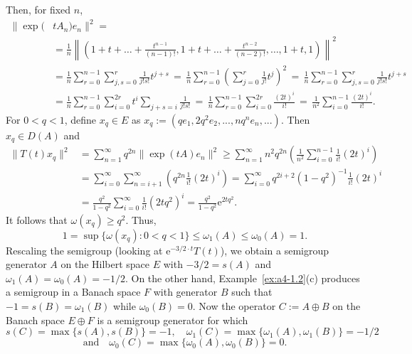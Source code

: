 \begin{example}
Then, for fixed $n$, 
\begin{align*}
\|\exp(&t A_n) e_n\|^2 = \\
&= \frac{1}{n} \left\| (1 + t + \dots + \frac{t^{n-1}}{(n-1)!}, 1 + t + \dots + \frac{t^{n-2}}{(n-2)!}, \dots, 1+t, 1) \right\|^2 \\
&=
\frac{1}{n} \sum_{r=0}^{n-1} \sum_{j,s=0}^{r} \frac{1}{j!s!} t^{j+s} \, = \,
\frac{1}{n} \sum_{r=0}^{n-1} \left(\sum_{j=0}^{r} \frac{1}{j!} t^j \right)^2 
\, = \, \frac{1}{n} \sum_{r=0}^{n-1} \sum_{j,s=0}^{r} \frac{1}{j!s!} t^{j+s} \\
&= 
\frac{1}{n} \sum_{r=0}^{n-1} \sum_{i=0}^{2r} t^i \sum_{j+s=i} \frac{1}{j!s!} \,
= \, 
\frac{1}{n} \sum_{r=0}^{n-1} \sum_{i=0}^{2r} \frac{(2t)^i}{i!} \,  = \,  \frac{1}{n^2} \sum_{i=0}^{n-1} \frac{(2t)^i}{i!}.
\end{align*}
 For $ 0 < q < 1 $, define $ x_q \in E $ as  
$
x_q := (q e_1, 2q^2 e_2, ..., n q^n e_n, ...).
$
Then $x_q \in D(A)$ and
\begin{align*}
\|T(t)x_q\|^2 & = \sum_{n=1}^{\infty} q^{2n} \| \exp(t A) e_n \|^2
\geq \sum_{n=1}^{\infty} n^2 q^{2n} \left(\frac{1}{n^2} \sum_{i=0}^{n-1}  \frac{1}{i!} (2t)^i \right)\\
&= \sum_{i=0}^{\infty} \sum_{n=i+1}^{\infty} \left( q^{2n} \frac{1}{i!} (2t)^i \right)
= \sum_{i=0}^{\infty} q^{2i+2} (1 - q^2)^{-1} \frac{1}{i!} (2t)^i \\
&= \frac{q^2}{1 - q^2} \sum_{i=0}^{\infty} \frac{1}{i!} (2t q^2)^i
= \frac{q^2}{1 - q^2} \mathrm{e}^{2t q^2}.
\end{align*}
It follows that $\omega(x_q) \geq q^2$. 
Thus,
\[
1 = \sup \{\omega(x_q)\colon0 < q < 1\} \leq \omega_1(A) \leq \omega_{0}(A) = 1.
\]
Rescaling the semigroup (\ie looking at $\mathrm{e}^{-3/2 \cdot t} T(t)$), we obtain a semigroup generator $A$ on the Hilbert space $E$ with $-3/2 = s(A)$ and $\omega_1(A) = \omega_{0}(A) = -1/2$. 
On the other hand, Example~\ref{ex:a4-1.2}(c) produces a semigroup in a Banach space $F$ with generator $B$ such that $-1 = s(B) = \omega_1(B)$ while $\omega_{0}(B) = 0$. 
Now the operator $C := A \oplus B$ on the Banach space $E \oplus F$ is a semigroup generator for which
\[
s(C) = \max \{s(A), s(B)\} = -1, \quad \omega_1(C) = \max\{\omega_1(A), \omega_1(B)\} = -1/2
\]
\[
\text{and} \quad \omega_{0}(C) = \max\{\omega_{0}(A), \omega_{0}(B)\} = 0.
\]
\end{example}
